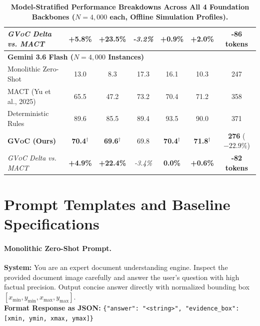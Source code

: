 \documentclass[11pt]{article}
\begin{document}
\begin{table}[t]
{\begin{tabular}{lcccccc}
\textit{\textsc{GVoC} Delta vs. MACT} & \textbf{+5.8\%} & \textbf{+23.5\%} & \textit{-3.2\%} & \textbf{+0.9\%} & \textbf{+2.0\%} & \textbf{-86 tokens} \\
\midrule
\multicolumn{7}{l}{\textbf{Gemini 3.6 Flash ($N = 4,000$ Instances)}} \\
Monolithic Zero-Shot & 13.0 & 8.3 & 17.3 & 16.1 & 10.3 & 247 \\
MACT (Yu et al., 2025) & 65.5 & 47.2 & 73.2 & 70.4 & 71.2 & 358 \\
Deterministic Rules & 89.6 & 85.5 & 89.4 & 93.5 & 90.0 & 371 \\
\textbf{\textsc{GVoC} (Ours)} & \textbf{70.4}$^\dagger$ & \textbf{69.6}$^\dagger$ & 69.8 & \textbf{70.4}$^\dagger$ & \textbf{71.8}$^\dagger$ & \textbf{276} ($-22.9\%$) \\
\textit{\textsc{GVoC} Delta vs. MACT} & \textbf{+4.9\%} & \textbf{+22.4\%} & \textit{-3.4\%} & \textbf{0.0\%} & \textbf{+0.6\%} & \textbf{-82 tokens} \\
\bottomrule
\end{tabular}
}
\vspace{-2mm}
\caption{\textbf{Model-Stratified Performance Breakdowns Across All 4 Foundation Backbones ($N = 4,000$ each, Offline Simulation Profiles).}}
\label{tab:model_breakdowns}
\end{table}

\section{Prompt Templates and Baseline Specifications}
\label{app:prompts}

\paragraph{Monolithic Zero-Shot Prompt.}
\begin{tcolorbox}[colback=gray!5,colframe=gray!50,arc=1mm,boxrule=0.5pt]
\small
\textbf{System:} You are an expert document understanding engine. Inspect the provided document image carefully and answer the user's question with high factual precision. Output concise answer directly with normalized bounding box $[x_{\min}, y_{\min}, x_{\max}, y_{\max}]$. \\
\textbf{Format Response as JSON:} \texttt{\{"answer": "<string>", "evidence\_box": [xmin, ymin, xmax, ymax]\}}
\end{tcolorbox}
\end{document}
